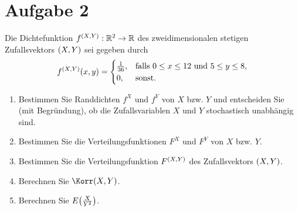\documentclass{exercise}
\begin{document}
    \section*{Aufgabe 2}
    
    \begin{problem}
        Die Dichtefunktion \(f^{\parentheses*{X, Y}}: \R^2 \to \R\) des zweidimensionalen stetigen Zufallsvektors \(\parentheses*{X, Y}\) sei gegeben durch
        \[
            f^{\parentheses*{X, Y}}\parentheses*{x, y} = \begin{cases}
                \frac{1}{36}, & \text{falls }0 \le x \le 12\text{ und }5 \le y \le 8,\\
                0, & \text{sonst}.
            \end{cases}
        \]
        \begin{enumerate}
            \item Bestimmen Sie Randdichten \(f^X\) und \(f^Y\) von \(X\) bzw. \(Y\) und entscheiden Sie (mit Begründung), ob die Zufallsvariablen \(X\) und \(Y\) stochastisch unabhängig sind.
            \item Bestimmen Sie die Verteilungsfunktionen \(F^X\) und \(F^Y\) von \(X\) bzw. \(Y\).
            \item Bestimmen Sie die Verteilungsfunktion \(F^{\parentheses*{X, Y}}\) des Zufallsvektors \(\parentheses*{X, Y}\).
            \item Berechnen Sie \(\Korr\parentheses*{X, Y}\).
            \item Berechnen Sie \(E\parentheses*{\frac{X}{Y^2}}\).
        \end{enumerate}
    \end{problem}
    
\end{document}
